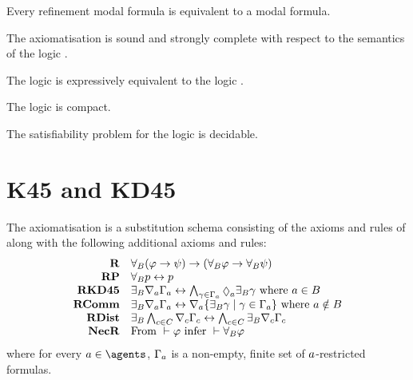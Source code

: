 
\begin{lemma}
Every refinement modal formula is equivalent to a modal formula.
\end{lemma}


\begin{theorem}
The axiomatisation \axiomRmlK{} is sound and strongly complete with respect to the semantics of the logic \logicRmlK{}.
\end{theorem}


\begin{corollary}
The logic \logicRmlK{} is expressively equivalent to the logic \logicK{}.
\end{corollary}

\begin{corollary}
The logic \logicRmlK{} is compact.
\end{corollary}

\begin{corollary}
The satisfiability problem for the logic \logicRmlK{} is decidable.
\end{corollary}

\section{K45 and KD45}


\begin{definition}
    The axiomatisation \axiomRmlKD{} is a substitution schema consisting of the axioms and rules of \axiomKD{} along with the following additional axioms and rules:
$$
\begin{array}{rl}
    {\bf R} & \allrefsBs (\phi \implies \psi) \implies (\allrefsBs \phi \implies \allrefsBs \psi)\\
    {\bf RP} & \allrefsBs \atomP \iff \atomP\\
    {\bf RKD45} & \somerefsBs \coversA \Gamma_\agentA \iff \bigwedge_{\gamma \in \Gamma_\agentA} \possibleA \somerefsBs \gamma \text{ where } \agentA \in \agentsB\\
    {\bf RComm} & \somerefsBs \coversA \Gamma_\agentA \iff \coversA \{\somerefsBs \gamma \mid \gamma \in \Gamma_\agentA\} \text{ where } \agentA \notin \agentsB\\
    {\bf RDist} & \somerefsBs \bigwedge_{\agentC \in \agentsC} \coversC \Gamma_\agentC \iff \bigwedge_{\agentC \in \agentsC} \somerefsBs \coversC \Gamma_\agentC\\
    {\bf NecR} & \text{From } \proves \phi \text{ infer } \proves \allrefsBs \phi
\end{array}
$$
where for every $\agentA \in \agents$, $\Gamma_a$ is a non-empty, finite set of $a$-restricted formulas.
\end{definition}

